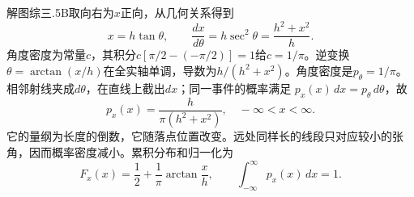 \documentclass[UTF8,fontset=fandol,a4paper,11pt]{ctexart}
\begin{document}
解图综三.5B取向右为$x$正向，从几何关系得到
\[
x=h\tan\theta,\qquad \frac{dx}{d\theta}=h\sec^2\theta
=\frac{h^2+x^2}{h}.
\]
角度密度为常量$c$，其积分$c[\pi/2-(-\pi/2)]=1$给$c=1/\pi$。逆变换$\theta=\arctan(x/h)$在全实轴单调，导数为$h/(h^2+x^2)$。角度密度是$p_\theta=1/\pi$。相邻射线夹成$d\theta$，在直线上截出$dx$；同一事件的概率满足
$p_x(x)\,dx=p_\theta\,d\theta$，故
\[
\boxed{p_x(x)=\frac{h}{\pi(h^2+x^2)}},\quad -\infty<x<\infty.
\]
它的量纲为长度的倒数，它随落点位置改变。远处同样长的线段只对应较小的张角，因而概率密度减小。累积分布和归一化为
\[
F_x(x)=\frac12+\frac1\pi\arctan\frac{x}{h},\qquad
\int_{-\infty}^{\infty}p_x(x)\,dx=1.
\]
\begin{center}\begin{minipage}{.98\linewidth}\centering
{}
\end{minipage}
\end{center}
\end{document}
